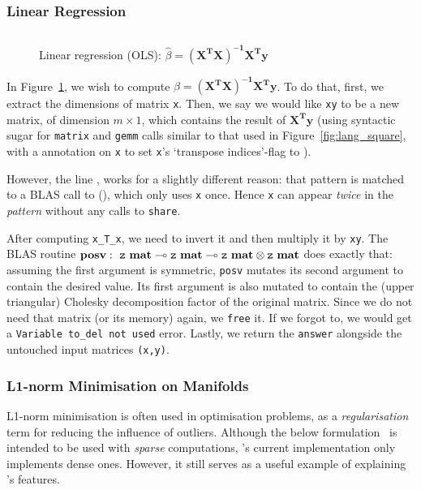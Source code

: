 \subsubsection{Linear Regression}

\begin{figure}[t]
    \centering
    \inputminted[fontsize=\small]{ocaml}{../../examples/lin_reg.lt}
    \caption{Linear regression (OLS): $\hat\beta =
        \mathbf{(X^T X)^{-1} X^T y}$}\label{fig:lang_lin_reg}
\end{figure}

In Figure~\ref{fig:lang_lin_reg}, we wish to compute $\hat\beta = \mathbf{(X^T
X)^{-1} X^T y}$. To do that, first, we extract the dimensions of matrix
\texttt{x}. Then, we say we would like \texttt{xy} to be a new matrix, of
dimension $m \times 1$, which contains the result of $\mathbf{X^T y}$ (using
syntactic sugar for \texttt{matrix} and \texttt{gemm} calls similar to that
used in Figure~\ref{fig:lang_square}, with a  annotation on
\texttt{x} to set \texttt{x}'s `transpose indices'-flag to ).

However, the line , works for a
slightly different reason: that pattern is matched to a BLAS call to
(), which only uses \texttt{x} once. Hence
\texttt{x} can appear \emph{twice} in the \emph{pattern} without any calls to
\texttt{share}.

After computing \texttt{x\_T\_x}, we need to invert it and then multiply it by
\texttt{xy}. The BLAS routine $\mathbf{posv}:\ {\texttt{z}\ \mathbf{mat}} \multimap
{\texttt{z}\ \mathbf{mat}} \multimap {\texttt{z}\ \mathbf{mat}} \otimes {\texttt{z}\ \mathbf{mat}}$ does
exactly that: assuming the first argument is symmetric, \texttt{posv} mutates
its second argument to contain the desired value. Its first argument is also
mutated to contain the (upper triangular) Cholesky decomposition factor of the
original matrix. Since we do not need that matrix (or its memory) again, we
\texttt{free} it. If we forgot to, we would get a \texttt{Variable to\_del not
used} error. Lastly, we return the \texttt{answer} alongside the untouched
input matrices \texttt{(x,y)}.

\subsubsection{L1-norm Minimisation on Manifolds}

L1-norm minimisation is often used in optimisation problems, as a
\emph{regularisation} term for reducing the influence of outliers.  Although
the below formulation~\cite{bronstein} is intended to be used with \emph{sparse}
computations, \lang's current implementation only implements dense ones.
However, it still serves as a useful example of explaining \lang's features.

